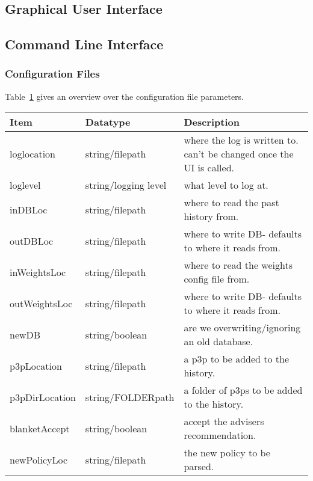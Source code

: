 \subsection{Graphical User Interface}

\subsection{Command Line Interface}

\subsubsection{Configuration Files}

Table~\ref{configTable} gives an overview over the configuration file parameters.

\begin{center}
  \begin{table}[h!]
    \label{configTable}
    \begin{tabular} { | l | l | p{7cm} | }
      \hline
      \textbf{Item} & \textbf{Datatype} & \textbf{Description} \\ \hline
      loglocation & string/filepath  & where the log is written to. can't be changed once the UI is  called. \\ \hline
      loglevel & string/logging level	& what level to log at. \\ \hline
      inDBLoc & string/filepath	& where to read the past history from. \\ \hline
      outDBLoc & string/filepath & where to write DB- defaults to where it reads from. \\ \hline
      inWeightsLoc& string/filepath & where to read the weights config file from. \\ \hline
      outWeightsLoc	& string/filepath & where to write DB- defaults to where it reads from. \\ \hline
      newDB & string/boolean & are we overwriting/ignoring an old database. \\ \hline
      p3pLocation & string/filepath & a p3p to be added to the history. \\ \hline
      p3pDirLocation	& string/FOLDERpath& a folder of p3ps to be added to the history. \\ \hline
      blanketAccept & string/boolean & accept the advisers recommendation. \\ \hline
      newPolicyLoc & string/filepath	& the new policy to be parsed. \\ \hline

\end{tabular}
\end{table}
\end{center}

